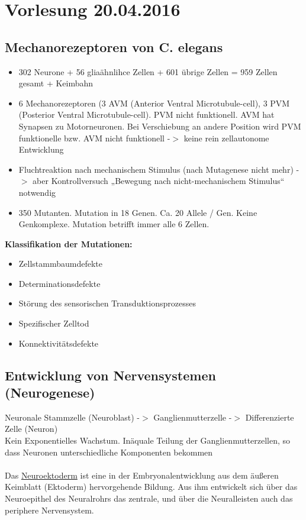 \section{Vorlesung 20.04.2016}

\subsection{Mechanorezeptoren von C. elegans}
\begin{itemize}
	\item 302 Neurone + 56 gliaähnlihce Zellen + 601 übrige Zellen = 959 Zellen gesamt + Keimbahn
	\item 6 Mechanorezeptoren (3 AVM (Anterior Ventral Microtubule-cell), 3 PVM (Posterior Ventral Microtubule-cell). PVM nicht funktionell. AVM hat Synapsen zu Motorneuronen. Bei Verschiebung an andere Position wird PVM funktionelle bzw. AVM nicht funktionell -$>$ keine rein zellautonome Entwicklung
	\item Fluchtreaktion nach mechanischem Stimulus (nach Mutagenese nicht mehr) -$>$ aber Kontrollversuch „Bewegung nach nicht-mechanischem Stimulus“ notwendig
	\item 350 Mutanten. Mutation in 18 Genen. Ca. 20 Allele / Gen. Keine Genkomplexe. Mutation betrifft immer alle 6 Zellen.
\end{itemize}

\textbf{Klassifikation der Mutationen:}
\begin{itemize}
	\item Zellstammbaumdefekte
	\item Determinationsdefekte
	\item Störung des sensorischen Transduktionsprozesses
	\item Spezifischer Zelltod
	\item Konnektivitätsdefekte
\end{itemize}

\subsection{Entwicklung von Nervensystemen (Neurogenese)}
Neuronale Stammzelle (Neuroblast) -$>$ Ganglienmutterzelle -$>$ Differenzierte Zelle (Neuron)\\
Kein Exponentielles Wachstum. Inäquale Teilung der Ganglienmutterzellen, so dass Neuronen unterschiedliche Komponenten bekommen\\
\\
Das \underline{Neuroektoderm} ist eine in der Embryonalentwicklung aus dem äußeren Keimblatt (Ektoderm) hervorgehende Bildung. Aus ihm entwickelt sich über das Neuroepithel des Neuralrohrs das zentrale, und über die Neuralleisten auch das periphere Nervensystem.\\

